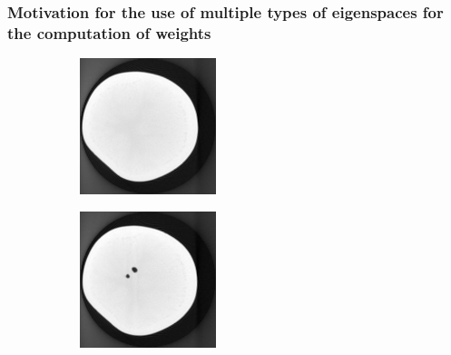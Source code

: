 \documentclass[journal]{IEEEtran}
\begin{document}
\subsubsection{\textbf{Motivation for the use of multiple types of eigenspaces for the computation of weights}}



\begin{figure}[!h]
    \begin{subfigure}[b]{0.24\linewidth}
        \includegraphics[width=\textwidth]{../images/potato/template_1.png}
\captionsetup{labelformat=empty}       
 \caption{}
    \end{subfigure}
    \begin{subfigure}[b]{0.24\linewidth}
        \includegraphics[width=\textwidth]{../images/potato/template_2.png}

\end{subfigure}
\end{figure}
\end{document}
